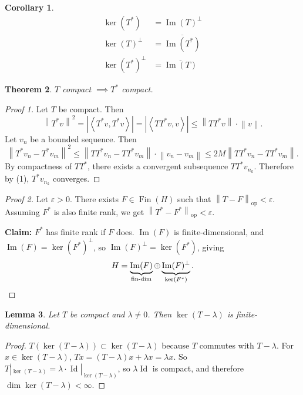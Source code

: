\documentclass[12pt]{article}
\DeclareMathOperator{\Id}{Id}
\renewcommand{\Im}{\operatorname{Im}}
\DeclareMathOperator{\Fin}{Fin}
\newcommand{\abs}[1]{\left| #1 \right|}
\newcommand{\norm}[1]{\left\| #1 \right\|}
\newcommand{\ip}[2]{\left\langle #1, #2 \right\rangle}
\newtheorem{thm}{Theorem}[section]
\newtheorem{lma}[thm]{Lemma}
\newtheorem{cor}[thm]{Corollary}
\theoremstyle{definition}
\begin{document}
\begin{cor}
	\begin{align*}
		\ker(T^*) &= \Im(T)^\perp \\
		\ker(T)^\perp &= \overline{\Im(T^*)} \\
		\ker(T^*)^\perp &= \overline{\Im(T)}
	\end{align*}
\end{cor}

\begin{thm}
	$T$ compact $\implies T^*$ compact.
\end{thm}
\begin{proof}[Proof 1]
	Let $T$ be compact.
	Then
	\begin{equation*}
		\norm{T^*v}^2 = \abs{\ip{T^*v}{T^*v}} = \abs{\ip{TT^*v}{v}} \leq \norm{TT^*v} \cdot \norm{v}. \tag{1}
	\end{equation*}
	Let $v_n$ be a bounded sequence.
	Then
	\begin{equation*}
		\norm{T^*v_n - T^*v_m}^2 \leq \norm{TT^*v_n - TT^*v_m} \cdot \norm{v_n - v_m} \leq 2M \norm{TT^*v_n - TT^*v_m}.
	\end{equation*}
	By compactness of $TT^*$, there exists a convergent subsequence $TT^*v_{n_k}$.
	Therefore by (1), $T^*v_{n_k}$ converges.
\end{proof}
\begin{proof}[Proof 2]
	Let $\varepsilon > 0$.
	There exists $F \in \Fin(H)$ such that $\norm{T - F}_{\mathrm{op}} < \varepsilon$.
	Assuming $F^*$ is also finite rank, we get $\norm{T^* - F^*}_{\mathrm{op}} < \varepsilon$.

	\textbf{Claim: } $F^*$ has finite rank if $F$ does.
	$\Im(F)$ is finite-dimensional, and $\Im(F) = \ker(F^*)^\perp$, so $\Im(F)^\perp = \ker(F^*)$, giving
	\begin{equation*}
		H = \underbrace{\Im(F)}_{\text{fin-dim}} \oplus \underbrace{\Im(F)^\perp}_{\ker(F^*)}. \qedhere
	\end{equation*}
\end{proof}

\begin{lma}
	Let $T$ be compact and $\lambda \neq 0$.
	Then $\ker(T-\lambda)$ is finite-dimensional.
\end{lma}
\begin{proof}
	$T(\ker(T-\lambda)) \subset \ker(T-\lambda)$ because $T$ commutes with $T-\lambda$.
	For $x \in \ker(T-\lambda)$, $Tx = (T-\lambda)x + \lambda x = \lambda x$.
	So $T|_{\ker(T-\lambda)} = \lambda \cdot \Id|_{\ker(T-\lambda)}$, so $\lambda \Id$ is compact, and therefore $\dim \ker(T-\lambda) < \infty$.
\end{proof}
\end{document}
